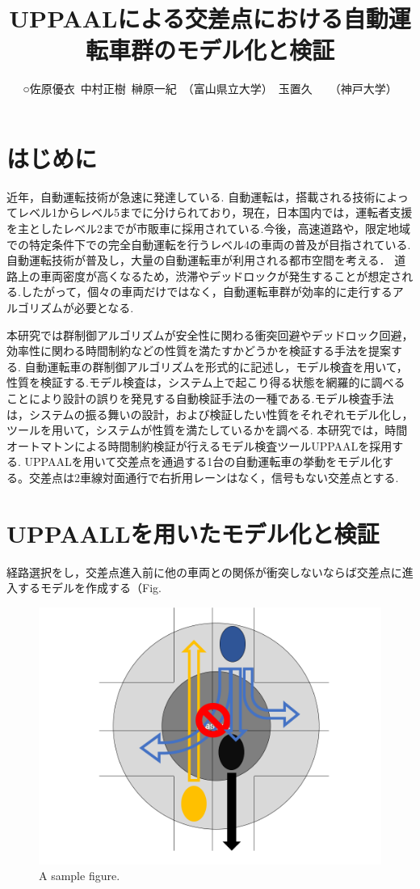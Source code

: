 \documentclass{jarticle}
\begin{document}
\title{UPPAALによる交差点における自動運転車群のモデル化と検証}
\author{○佐原優衣\ 中村正樹\ 榊原一紀\ （富山県立大学）\ 玉置久　\ （神戸大学）}



\maketitle\thispagestyle{empty}
\pagestyle{empty}

\section{はじめに}
近年，自動運転技術が急速に発達している. 自動運転は，搭載される技術によってレベル1からレベル5までに分けられており，現在，日本国内では，運転者支援を主としたレベル2までが市販車に採用されている.今後，高速道路や，限定地域での特定条件下での完全自動運転を行うレベル4の車両の普及が目指されている.
自動運転技術が普及し，大量の自動運転車が利用される都市空間を考える．
道路上の車両密度が高くなるため，渋滞やデッドロックが発生することが想定される.したがって，個々の車両だけではなく，自動運転車群が効率的に走行するアルゴリズムが必要となる.
	
本研究では群制御アルゴリズムが安全性に関わる衝突回避やデッドロック回避，効率性に関わる時間制約などの性質を満たすかどうかを検証する手法を提案する.
自動運転車の群制御アルゴリズムを形式的に記述し，モデル検査を用いて，性質を検証する.モデル検査は，システム上で起こり得る状態を網羅的に調べることにより設計の誤りを発見する自動検証手法の一種である.モデル検査手法は，システムの振る舞いの設計，および検証したい性質をそれぞれモデル化し，ツールを用いて，システムが性質を満たしているかを調べる.
本研究では，時間オートマトン\cite{u3}による時間制約検証が行えるモデル検査ツールUPPAAL\cite{u1,u2}を採用する.
UPPAALを用いて交差点を通過する1台の自動運転車の挙動をモデル化する。交差点は2車線対面通行で右折用レーンはなく，信号もない交差点とする.
\section{UPPAALLを用いたモデル化と検証}
経路選択をし，交差点進入前に他の車両との関係が衝突しないならば交差点に進入するモデルを作成する（Fig.%

\begin{figure}[t]
  \centering
\ifLaTeXe
  \includegraphics[width=0.5\linewidth]{model.png}
  \caption{A sample figure.}
  \label{model}
\end{figure}
\end{document}
